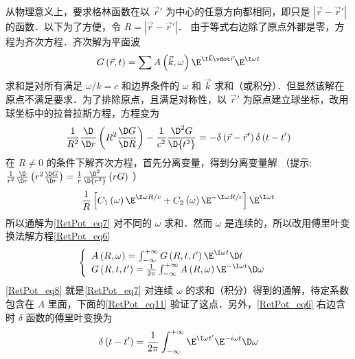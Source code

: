 从物理意义上，要求格林函数在以 $\vec r'$ 为中心的任意方向都相同，即只是 $\left| {\vec r - \vec r'} \right|$ 的函数．以下为了方便，令 $R = \left| {\vec r - \vec r'} \right|$． 
由于等式右边除了原点外都是零，方程为齐次方程．齐次解为平面波
\begin{equation}
G\left( {\vec r,t} \right) = \sum {A\left( {\vec k,\omega } \right){\E^{\I \vec k \vdot \vec r}}{\E^{\I\omega t}}} 
\end{equation} 
求和是对所有满足 $\omega /k = c$ 和边界条件的 $\omega$ 和 $\vec k$ 求和（或积分）．但显然该解在原点不满足要求．为了排除原点，且满足对称性，以 $\vec r'$ 为原点建立球坐标，改用球坐标中的拉普拉斯方程，方程变为
\begin{equation}\label{RetPot_eq6}
\frac{1}{R^2}\frac{\D }{\D r}\left( {{R^2}\frac{\D G}{\D R}} \right) - \frac{1}{c^2}\frac{{\D ^2}G}{\D {t^2}} =  - \delta \left( {\vec r - \vec r'} \right)\delta \left( {t - t'} \right)
\end{equation} 
在 $R \ne 0$ 的条件下解齐次方程，首先分离变量，得到分离变量解
（提示: $\frac{1}{{{r^2}}}\frac{\D }{{\D r}}\left( {{r^2}\frac{{\D G}}{{\D r}}} \right) = \frac{1}{r}\frac{{{\D ^2}}}{{\D {r^2}}}\left( {rG} \right)$ ）
\begin{equation}\label{RetPot_eq7}
\frac{1}{R}\left[ {{C_1}\left( \omega  \right){\E^{\I\omega R/c}} + {C_2}\left( \omega  \right){\E^{ - \I\omega R/c}}} \right]{\E^{\I\omega t}}
\end{equation} 
所以通解为\autoref{RetPot_eq7} 对不同的 $\omega$ 求和．然而 $\omega$ 是连续的，所以改用傅里叶变换法解方程\autoref{RetPot_eq6} 
\begin{equation}\label{RetPot_eq8}
\left\{ \begin{array}{l}
A\left( {R,\omega } \right) = \int_{ - \infty }^{ + \infty } {G\left( {R,t,t'} \right){\E^{\I\omega t}}\D t} {\kern 1pt} {\kern 1pt} {\kern 1pt} {\kern 1pt} {\kern 1pt} {\kern 1pt} {\kern 1pt} {\kern 1pt} \\
G\left( {R,t,t'} \right) = \frac{1}{2\pi }\int_{ - \infty }^{ + \infty } {A\left( {R,\omega } \right){\E^{ - \I\omega t}}\D \omega } {\kern 1pt} {\kern 1pt} {\kern 1pt} {\kern 1pt} {\kern 1pt} {\kern 1pt} {\kern 1pt} {\kern 1pt} 
\end{array} \right.
\end{equation} 
\autoref{RetPot_eq8} 就是\autoref{RetPot_eq7} 对连续 $\omega$ 的求和（积分）得到的通解，待定系数包含在 $A$ 里面，下面的\autoref{RetPot_eq11} 验证了这点．另外，\autoref{RetPot_eq6} 右边含时 $\delta$ 函数的傅里叶变换为
\begin{equation}\label{RetPot_eq9}
\delta \left( {t - t'} \right) = \frac{1}{2\pi }\int_{ - \infty }^{ + \infty } {{\E^{\I\omega t'}}{\E^{ - i\omega t}}\D \omega } 
\end{equation} 
